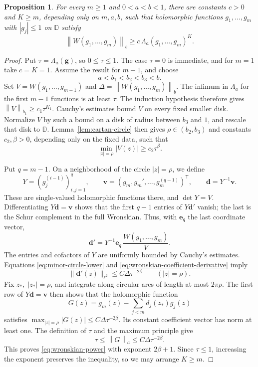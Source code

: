 \documentclass[12pt,letterpaper,reqno]{amsart}
\newtheorem{prop}[thm]{Proposition}
\theoremstyle{definition}
\numberwithin{equation}{section}
\newcommand{\D}{\mathbb D}
\newcommand{\norm}[2]{\left\lVert #1\right\rVert_{#2}}
\begin{document}
	\begin{prop}\label{prop:wronskian}
		For every $m\ge1$ and $0<a<b<1$, there are constants $c>0$ and
		$K\ge m$, depending only on $m,a,b$, such that holomorphic functions
		$g_1,\ldots,g_m$ with $|g_j|\le1$ on $\D$ satisfy
		\begin{equation}\label{eq:wronskian-power}
			\norm{W(g_1,\ldots,g_m)}{b}
			\ge c\,\Lambda_a(g_1,\ldots,g_m)^K.
		\end{equation}
	\end{prop}
	
	\begin{proof}
		Put $\tau=\Lambda_a(\bm{g})$, so $0\le\tau\le1$.
		The case $\tau=0$ is immediate, and for $m=1$ take $c=K=1$.
		Assume the result for $m-1$, and choose
		\[
		a<b_1<b_2<b_3<b.
		\]
		Set $V=W(g_1,\ldots,g_{m-1})$ and
		$\Delta=\norm{W(g_1,\ldots,g_m)}{b}$.
		The infimum in $\Lambda_a$ for the first $m-1$ functions is at least $\tau$.
		The induction hypothesis therefore gives
		$\norm{V}{b_1}\ge c_1\tau^{K_1}$.
		Cauchy's estimates bound $V$ on every fixed smaller disk.
		Normalize $V$ by such a bound on a disk of radius between $b_3$
		and $1$, and rescale that disk to $\D$.
		Lemma~\ref{lem:cartan-circle} then gives $\rho\in(b_2,b_3)$ and
		constants $c_2,\beta>0$, depending only on the fixed data, such that
		\begin{equation}\label{eq:minor-circle-lower}
			\min_{|z|=\rho}|V(z)|\ge c_2\tau^\beta.
		\end{equation}
		
		Put $q=m-1$. On a neighborhood of the circle $|z|=\rho$, we define
		\[
		Y=(g_j^{(i-1)})_{i,j=1}^q,\qquad
		\bm{v}=(g_m,g_m',\ldots,g_m^{(q-1)})^{\mathsf T},
		\qquad \bm{d}=Y^{-1}\bm{v}.
		\]
		These are single-valued holomorphic functions there, and $\det Y=V$.
		Differentiating $Y\bm{d}=\bm{v}$ shows that the first
		$q-1$ entries of $Y\bm{d}'$ vanish; the last is the Schur
		complement in the full Wronskian. Thus, with $\bm{e}_q$
		the last coordinate vector,
		\begin{equation}\label{eq:wronskian-coefficient-derivative}
			\bm{d}'
			=Y^{-1}\bm{e}_q\,\frac{W(g_1,\ldots,g_m)}{V}.
		\end{equation}
		The entries and cofactors of $Y$ are uniformly bounded by Cauchy's
		estimates. Equations \eqref{eq:minor-circle-lower} and
		\eqref{eq:wronskian-coefficient-derivative} imply
		\[
		\|\bm{d}'(z)\|_{\ell^2}\le C\Delta\tau^{-2\beta}
		\qquad(|z|=\rho).
		\]
		Fix $z_*,\; |z_*|=\rho$, and integrate along circular arcs of length
		at most $2\pi\rho$. The first row of $Y\bm{d}=\bm{v}$
		then shows that the holomorphic function
		\[
		G(z)=g_m(z)-\sum_{j<m}d_j(z_*)g_j(z)
		\]
		satisfies $\max_{|z|=\rho}|G(z)|\le C\Delta\tau^{-2\beta}$.
		Its constant coefficient vector has norm at least one.
		The definition of $\tau$ and the maximum principle give
		\[
		\tau\le\norm{G}{a}\le C\Delta\tau^{-2\beta}.
		\]
		This proves \eqref{eq:wronskian-power} with exponent $2\beta+1$.
		Since $\tau\le1$, increasing the exponent preserves the inequality,
		so we may arrange $K\ge m$.
	\end{proof}
	
\end{document}
